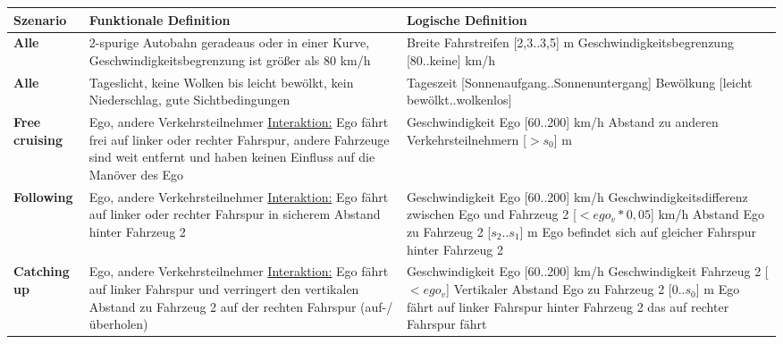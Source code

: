 \small
\begin{longtable}[c]{p{1.5cm} p{6cm} p{6cm}}
\textbf{Szenario} & \textbf{Funktionale Definition} & \textbf{Logische Definition} \\
\hline
\endhead

\textbf{Alle} & 2-spurige Autobahn geradeaus oder in einer Kurve, Geschwindigkeitsbegrenzung ist größer als 80 km/h & Breite Fahrstreifen [2,3..3,5] m \newline Geschwindigkeitsbegrenzung [80..keine] km/h \\
\hline

\textbf{Alle} & Tageslicht, keine Wolken bis leicht bewölkt, kein Niederschlag, gute Sichtbedingungen & Tageszeit [Sonnenaufgang..Sonnenuntergang] \newline Bewölkung [leicht bewölkt..wolkenlos]\\
\hline \hline

\textbf{Free cruising} & Ego, andere Verkehrsteilnehmer \newline \underline{Interaktion:} Ego fährt frei auf linker oder rechter Fahrspur, andere Fahrzeuge sind weit entfernt und haben keinen Einfluss auf die Manöver des Ego & Geschwindigkeit Ego [60..200] km/h \newline Abstand zu anderen Verkehrsteilnehmern [$>s_0$] m \\
\hline

\textbf{Following} & Ego, andere Verkehrsteilnehmer \newline \underline{Interaktion:} Ego fährt auf linker oder rechter Fahrspur in sicherem Abstand hinter Fahrzeug 2 & Geschwindigkeit Ego [60..200] km/h \newline Geschwindigkeitsdifferenz zwischen Ego und Fahrzeug 2  [$<ego_v*0,05$] km/h \newline Abstand Ego zu Fahrzeug 2 [$s_2$..$s_1$] m \newline Ego befindet sich auf gleicher Fahrspur hinter Fahrzeug 2 \\
\hline

\textbf{Catching up} & Ego, andere Verkehrsteilnehmer \newline \underline{Interaktion:} Ego fährt auf linker Fahrspur und verringert den vertikalen Abstand zu Fahrzeug 2 auf der rechten Fahrspur (auf-/überholen) & Geschwindigkeit Ego [60..200] km/h \newline Geschwindigkeit Fahrzeug 2 [$<ego_v$] \newline Vertikaler Abstand Ego zu Fahrzeug 2 [0..$s_0$] m \newline Ego fährt auf linker Fahrspur hinter Fahrzeug 2 das auf rechter Fahrspur fährt \\
\hline


\end{longtable}

